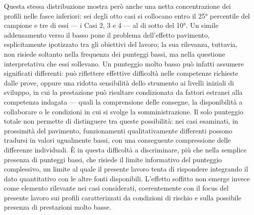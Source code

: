 Questa stessa distribuzione mostra però anche una netta concentrazione dei profili nelle fasce inferiori: sei degli otto casi si collocano entro il 25° percentile del campione e tre di essi --- i Casi 2, 3 e 4 --- al di sotto del 10°. Un simile addensamento verso il basso pone il problema dell'effetto pavimento, esplicitamente ipotizzato tra gli obiettivi del lavoro; la sua rilevanza, tuttavia, non risiede soltanto nella frequenza dei punteggi bassi, ma nella questione interpretativa che essi sollevano. Un punteggio molto basso può infatti assumere significati differenti: può riflettere effettive difficoltà nelle competenze richieste dalle prove, oppure una ridotta sensibilità dello strumento ai livelli iniziali di sviluppo, in cui la prestazione può risultare condizionata da fattori estranei alla competenza indagata --- quali la comprensione delle consegne, la disponibilità a collaborare o le condizioni in cui si svolge la somministrazione. Il solo punteggio totale non permette di distinguere tra queste possibilità: nei casi esaminati, in prossimità del pavimento, funzionamenti qualitativamente differenti possono tradursi in valori ugualmente bassi, con una conseguente compressione delle differenze individuali. È in questa difficoltà a discriminare, più che nella semplice presenza di punteggi bassi, che risiede il limite informativo del punteggio complessivo, un limite al quale il presente lavoro tenta di rispondere integrando il dato quantitativo con le altre fonti disponibili. L'effetto soffitto non emerge invece come elemento rilevante nei casi considerati, coerentemente con il focus del presente lavoro sui profili caratterizzati da condizioni di rischio e sulla possibile presenza di prestazioni molto basse.

